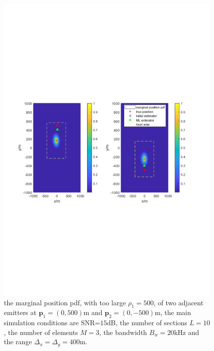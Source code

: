 \documentclass[review]{elsarticle}
\begin{document}
\begin{figure}[!t]
    \centerline{\includegraphics[width=1\textwidth]{pdfFigures/toolarge_rho1=500.pdf}}
    \centering
	\caption{the marginal position pdf, with too large $\rho_1=500$, of two adjacent emitters at $\boldsymbol{p}_1=(0,500)$m and $\boldsymbol{p}_2=(0,-500)$m, the main simulation conditions are SNR=$15$dB, the number of sections $L=10$, the number of elements $M=3$, the bandwidth $B_w=20$kHz and the range $\Delta_x=\Delta_y=400$m.}\label{fig1}
\end{figure}
\end{document}
